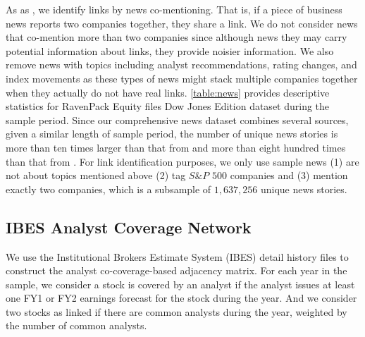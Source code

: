 As as \cite{ge2021news}, we identify links by news co-mentioning. That is, if a piece of business news reports two companies together, they share a link. We do not consider news that co-mention more than two companies since although news they may carry potential information about links, they provide noisier information. We also remove news with topics including analyst recommendations, rating changes, and index movements as these types of news might stack multiple companies together when they actually do not have real links. \autoref{table:news} provides descriptive statistics for RavenPack Equity files Dow Jones Edition dataset during the sample period. Since our comprehensive news dataset combines several sources, given a similar length of sample period, the number of unique news stories is more than ten times larger than that from \cite{scherbina2015economic} and more than eight hundred times than that from \cite{schwenkler2019network}. For link identification purposes, we only use sample news (1) are not about topics mentioned above (2) tag $S\& P$ $500$ companies and (3) mention exactly two companies, which is a subsample of $1,637,256$ unique news stories.

\subsection{IBES Analyst Coverage Network}
We use the Institutional Brokers Estimate System (IBES) detail history files to construct the analyst co-coverage-based adjacency matrix. For each year in the sample, we consider a stock is covered by an analyst if the analyst issues at least one FY1 or FY2 earnings forecast for the stock during the year. And we consider two stocks as linked if there are common analysts during the year, weighted by the number of common analysts. 

